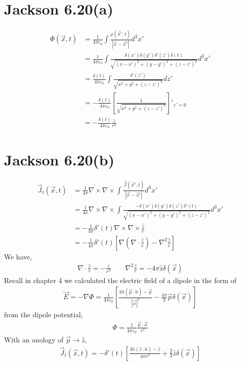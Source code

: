 \documentclass{article}
\begin{document}
\section*{Jackson 6.20(a)}

\begin{align*}
  \Phi(\vec x,t)&=\frac{1}{4\pi\varepsilon_0}\int\frac{\rho(\vec x',t)}{|\vec x-\vec x'|}d^3x'\\
                &=\frac{1}{4\pi\varepsilon_0}\int\frac{\delta(x')\delta(y')\delta'(z')\delta(t)}{\sqrt{(x-x')^2+(y-y')^2+(z-z')^2}}d^3x'\\
                &=\frac{\delta(t)}{4\pi\varepsilon_0}\int\frac{\delta'(z')}{\sqrt{x^2+y^2+(z-z')^2}}dz'\\
                &=-\frac{\delta(t)}{4\pi\varepsilon_0}[\frac{1}{\sqrt{x^2+y^2+(z-z')^2}}]'_{z'=0}\\
                &=-\frac{\delta(t)}{4\pi\varepsilon_0}\frac{z}{r^3}
\end{align*}

\section*{Jackson 6.20(b)}

\begin{align*}
  \vec J_t(\vec x,t)&=\frac{1}{4\pi}\nabla\times\nabla\times\int\frac{\vec J(\vec x',t)}{|\vec x-\vec x'|}d^3x'\\
                    &=\frac{1}{4\pi}\nabla\times\nabla\times\int\frac{-\delta(x')\delta(y')\delta(z')\delta'(t)}{\sqrt{(x-x')^2+(y-y')^2+(z-z')^2}}d^3x'\\
                    &=-\frac{1}{4\pi}\delta'(t)\nabla\times\nabla\times\frac{\hat z}{r}\\
                    &=-\frac{1}{4\pi}\delta'(t)[\nabla(\nabla\cdot\frac{\hat z}{r})-\nabla^2\frac{\hat z}{r}]
\end{align*}
We have,
\begin{align*}
  \nabla\cdot\frac{\hat z}{r}=-\frac{z}{r^3}\qquad\nabla^2\frac{\hat z}{r}=-4\pi\hat z\delta(\vec x)
\end{align*}
Recall in chapter 4 we calculated the electric field of a dipole in the form of
\begin{align*}
  \vec E=-\nabla\Phi=\frac{1}{4\pi\varepsilon_0}[\frac{3\hat n(\vec p\cdot\hat n)-\vec p}{|\vec x|^3}-\frac{4\pi}{3}\vec p\delta(\vec x)]
\end{align*}
from the dipole potential,
\begin{align*}
  \Phi=\frac{1}{4\pi\varepsilon_0}\frac{\vec p\cdot\vec x}{r^3}
\end{align*}
With an anology of $\vec p\rightarrow\hat z$,
\begin{align*}
  \vec J_t(\vec x,t)=-\delta'(t)[\frac{3\hat n(\hat z\cdot\hat n)-\hat z}{4\pi r^3}+\frac{2}{3}\hat z\delta(\vec x)]
\end{align*}
\pagebreak
\end{document}
